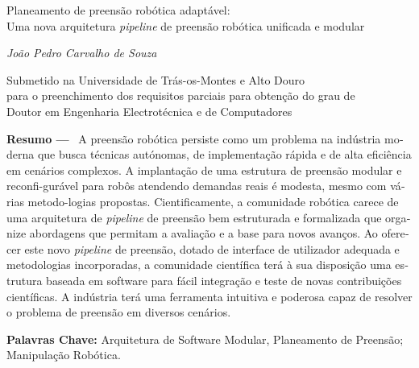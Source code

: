 \begin{otherlanguage}{portuguese}

\begin{center}
\large{Planeamento de preensão robótica adaptável: \\ Uma nova arquitetura \textit{pipeline} de preensão robótica unificada e modular}

\vskip5mm
\normalsize{\textit{João Pedro Carvalho de Souza}}


\vskip5mm
\small{Submetido na Universidade de Trás-os-Montes e Alto Douro \\
para o preenchimento dos requisitos parciais para obtenção do grau de \\
Doutor em Engenharia Electrotécnica e de Computadores}
\end{center}



\textbf{Resumo ---}
\
A preensão robótica persiste como um problema na indústria moderna que busca técnicas autónomas, de implementação rápida e de alta eficiência em cenários complexos. A implantação de uma estrutura de preensão modular e reconfi-gurável para robôs atendendo demandas reais é modesta, mesmo com várias metodo-logias propostas. Cientificamente, a comunidade robótica carece de uma arquitetura de \textit{pipeline} de preensão bem estruturada e formalizada que organize abordagens que permitam a avaliação e a base para novos avanços. Ao oferecer este novo \textit{pipeline} de preensão, dotado de interface de utilizador adequada e metodologias incorporadas, a comunidade científica terá à sua disposição uma estrutura baseada em software para fácil integração e teste de novas contribuições científicas. A indústria terá uma ferramenta intuitiva e poderosa capaz de resolver o problema de preensão em diversos cenários.

\textbf{Palavras Chave:} Arquitetura de Software Modular, Planeamento de Preensão; Manipulação Robótica.

\end{otherlanguage}
